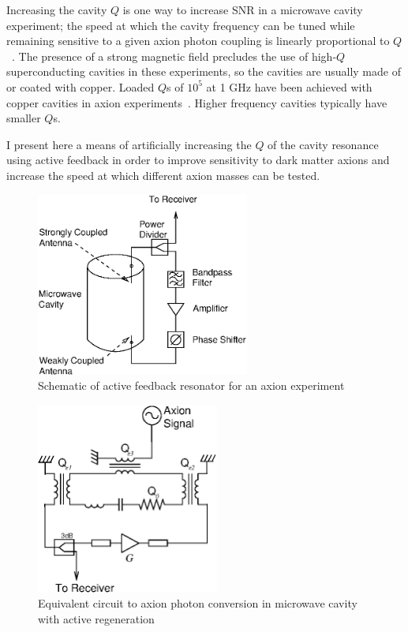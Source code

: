 \documentclass[aps,prl,twocolumn,groupedaddress]{revtex4-1}
\begin{document}
Increasing the cavity $Q$ is one way to increase SNR in a microwave cavity experiment; the speed at which the cavity frequency can be tuned while remaining sensitive to a given axion photon coupling is linearly proportional to $Q$~\cite{Peng2000569}.
The presence of a strong magnetic field precludes the use of high-$Q$ superconducting cavities in these experiments, so the cavities are usually made of or coated with copper.
Loaded $Q$s of $10^5$ at 1 GHz have been achieved with copper cavities in axion experiments~\cite{Peng2000569}.  Higher frequency cavities typically have smaller $Q$s.

I present here a means of artificially increasing the $Q$ of the cavity resonance using active feedback in order to improve sensitivity to dark matter axions and increase the speed at which different axion masses can be tested.

\begin{figure}
\includegraphics[width=7cm]{experiment_schematic.eps}
\caption{\label{fig:experiment_schematic} Schematic of active feedback resonator for an axion experiment}
\end{figure}


\begin{figure}
\includegraphics[width=6cm]{equivalent_circuit.eps}
\caption{\label{fig:equiv_circuit} Equivalent circuit to axion photon conversion in microwave cavity with active regeneration}
\end{figure}
\end{document}
